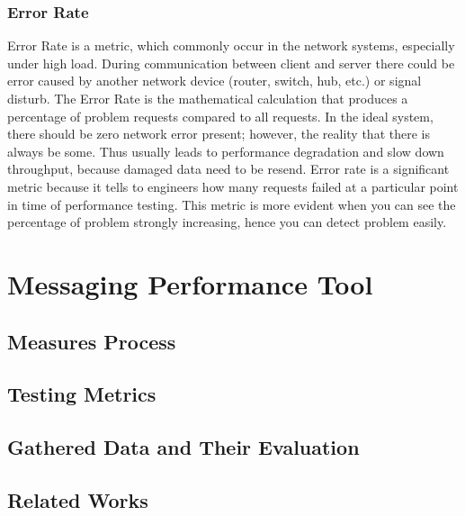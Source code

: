 \subsection{Error Rate}
Error Rate is a metric, which commonly occur in the network systems, especially under high load. During communication between client and server there could be error caused by another network device (router, switch, hub, etc.) or signal disturb. The Error Rate is the mathematical calculation that produces a percentage of problem requests compared to all requests. In the ideal system, there should be zero network error present; however, the reality that there is always be some. Thus usually leads to performance degradation and slow down throughput, because damaged data need to be resend.
Error rate is a significant metric because it tells to engineers how many requests failed at a particular point in time of performance testing. This metric is more evident when you can see the percentage of problem strongly increasing, hence you can detect problem easily.

\chapter{Messaging Performance Tool}
\label{Messaging Performance Tool}


\section{Measures Process}
\label{Measures Process}

\section{Testing Metrics}
\label{Testing Metrics}

\section{Gathered Data and Their Evaluation}
\label{Gathered Data and Their Evaluation}

\section{Related Works}
\label{Related Works}

